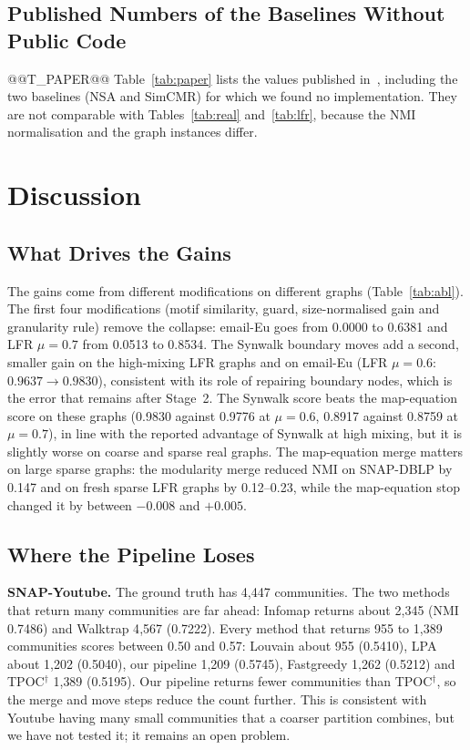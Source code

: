 \documentclass[conference]{IEEEtran}
\begin{document}
\subsection{Published Numbers of the Baselines Without Public Code}
@@T_PAPER@@
Table~\ref{tab:paper} lists the values published in~\cite{kong2026}, including the two baselines (NSA and SimCMR) for which we found no implementation. They are not comparable with Tables~\ref{tab:real} and~\ref{tab:lfr}, because the NMI normalisation and the graph instances differ.

\section{Discussion}\label{sec:discussion}
\subsection{What Drives the Gains}
The gains come from different modifications on different graphs (Table~\ref{tab:abl}). The first four modifications (motif similarity, guard, size-normalised gain and granularity rule) remove the collapse: email-Eu goes from 0.0000 to 0.6381 and LFR $\mu{=}0.7$ from 0.0513 to 0.8534. The Synwalk boundary moves add a second, smaller gain on the high-mixing LFR graphs and on email-Eu (LFR $\mu{=}0.6$: $0.9637\to0.9830$), consistent with its role of repairing boundary nodes, which is the error that remains after Stage~2. The Synwalk score beats the map-equation score on these graphs (0.9830 against 0.9776 at $\mu{=}0.6$, 0.8917 against 0.8759 at $\mu{=}0.7$), in line with the reported advantage of Synwalk at high mixing, but it is slightly worse on coarse and sparse real graphs. The map-equation merge matters on large sparse graphs: the modularity merge reduced NMI on SNAP-DBLP by 0.147 and on fresh sparse LFR graphs by 0.12--0.23, while the map-equation stop changed it by between $-0.008$ and $+0.005$.

\subsection{Where the Pipeline Loses}
\textbf{SNAP-Youtube.} The ground truth has 4{,}447 communities. The two methods that return many communities are far ahead: Infomap returns about 2{,}345 (NMI 0.7486) and Walktrap 4{,}567 (0.7222). Every method that returns 955 to 1{,}389 communities scores between 0.50 and 0.57: Louvain about 955 (0.5410), LPA about 1{,}202 (0.5040), our pipeline 1{,}209 (0.5745), Fastgreedy 1{,}262 (0.5212) and TPOC$^{\dagger}$ 1{,}389 (0.5195). Our pipeline returns fewer communities than TPOC$^{\dagger}$, so the merge and move steps reduce the count further. This is consistent with Youtube having many small communities that a coarser partition combines, but we have not tested it; it remains an open problem.
\end{document}
